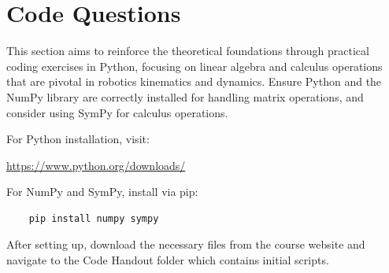 \documentclass{16384_doc}
\begin{document}
\section{Code Questions}

This section aims to reinforce the theoretical foundations through practical coding exercises in Python, focusing on linear algebra and calculus operations that are pivotal in robotics kinematics and dynamics. Ensure Python and the NumPy library are correctly installed for handling matrix operations, and consider using SymPy for calculus operations.

For Python installation, visit:
\begin{center}
    \href{https://www.python.org/downloads/}{https://www.python.org/downloads/}
\end{center}
For NumPy and SymPy, install via pip:
\begin{verbatim}
    pip install numpy sympy
\end{verbatim}

After setting up, download the necessary files from the course website and navigate to the Code Handout folder which contains initial scripts.
\end{document}
